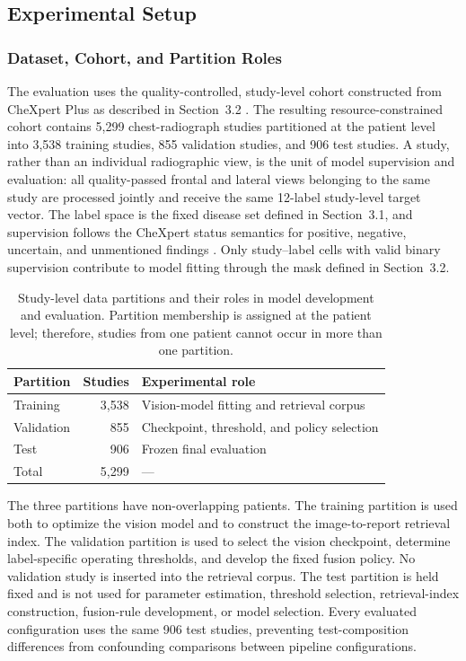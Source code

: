\subsection{Experimental Setup}
\label{sec:experimental-setup}

\subsubsection{Dataset, Cohort, and Partition Roles}

The evaluation uses the quality-controlled, study-level cohort constructed from CheXpert Plus as described in Section~3.2 \cite{chambon2024chexpertplus}. The resulting resource-constrained cohort contains 5,299 chest-radiograph studies partitioned at the patient level into 3,538 training studies, 855 validation studies, and 906 test studies. A study, rather than an individual radiographic view, is the unit of model supervision and evaluation: all quality-passed frontal and lateral views belonging to the same study are processed jointly and receive the same 12-label study-level target vector. The label space is the fixed disease set defined in Section~3.1, and supervision follows the CheXpert status semantics for positive, negative, uncertain, and unmentioned findings \cite{irvin2019chexpert}. Only study--label cells with valid binary supervision contribute to model fitting through the mask defined in Section~3.2.

\begin{table}[H]
\centering
\caption{Study-level data partitions and their roles in model development and evaluation. Partition membership is assigned at the patient level; therefore, studies from one patient cannot occur in more than one partition.}
\label{tab:experimental-partitions}
\begin{tabular}{lrl}
\toprule
Partition & Studies & Experimental role \\
\midrule
Training & 3,538 & Vision-model fitting and retrieval corpus \\
Validation & 855 & Checkpoint, threshold, and policy selection \\
Test & 906 & Frozen final evaluation \\
\midrule
Total & 5,299 & --- \\
\bottomrule
\end{tabular}
\end{table}

The three partitions have non-overlapping patients. The training partition is used both to optimize the vision model and to construct the image-to-report retrieval index. The validation partition is used to select the vision checkpoint, determine label-specific operating thresholds, and develop the fixed fusion policy. No validation study is inserted into the retrieval corpus. The test partition is held fixed and is not used for parameter estimation, threshold selection, retrieval-index construction, fusion-rule development, or model selection. Every evaluated configuration uses the same 906 test studies, preventing test-composition differences from confounding comparisons between pipeline configurations.

